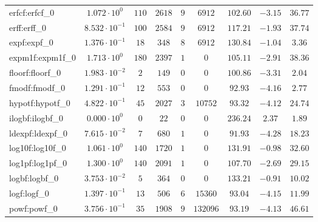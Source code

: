 \begin{tabular}{|l|c|c|c|c|c|c|c|c|}
erfcf:erfcf\_0               & $ 1.072 \cdot 10^{0}  $ & $ 110    $ & $ 2618  $ & $ 9   $ & $ 6912   $ & $ 102.60      $ & $ -3.15   $ & $ 36.77   $ \\
erff:erff\_0                 & $ 8.532 \cdot 10^{-1} $ & $ 100    $ & $ 2584  $ & $ 9   $ & $ 6912   $ & $ 117.21      $ & $ -1.93   $ & $ 37.74   $ \\
expf:expf\_0                 & $ 1.376 \cdot 10^{-1} $ & $ 18     $ & $ 348   $ & $ 8   $ & $ 6912   $ & $ 130.84      $ & $ -1.04   $ & $ 3.36    $ \\
expm1f:expm1f\_0             & $ 1.713 \cdot 10^{0}  $ & $ 180    $ & $ 2397  $ & $ 1   $ & $ 0      $ & $ 105.11      $ & $ -2.91   $ & $ 38.36   $ \\
floorf:floorf\_0             & $ 1.983 \cdot 10^{-2} $ & $ 2      $ & $ 149   $ & $ 0   $ & $ 0      $ & $ 100.86      $ & $ -3.31   $ & $ 2.04    $ \\
fmodf:fmodf\_0               & $ 1.291 \cdot 10^{-1} $ & $ 12     $ & $ 553   $ & $ 0   $ & $ 0      $ & $ 92.93       $ & $ -4.16   $ & $ 2.77    $ \\
hypotf:hypotf\_0             & $ 4.822 \cdot 10^{-1} $ & $ 45     $ & $ 2027  $ & $ 3   $ & $ 10752  $ & $ 93.32       $ & $ -4.12   $ & $ 24.74   $ \\
ilogbf:ilogbf\_0             & $ 0.000 \cdot 10^{0}  $ & $ 0      $ & $ 22    $ & $ 0   $ & $ 0      $ & $ 236.24      $ & $ 2.37    $ & $ 1.89    $ \\
ldexpf:ldexpf\_0             & $ 7.615 \cdot 10^{-2} $ & $ 7      $ & $ 680   $ & $ 1   $ & $ 0      $ & $ 91.93       $ & $ -4.28   $ & $ 18.23   $ \\
log10f:log10f\_0             & $ 1.061 \cdot 10^{0}  $ & $ 140    $ & $ 1720  $ & $ 1   $ & $ 0      $ & $ 131.91      $ & $ -0.98   $ & $ 32.60   $ \\
log1pf:log1pf\_0             & $ 1.300 \cdot 10^{0}  $ & $ 140    $ & $ 2091  $ & $ 1   $ & $ 0      $ & $ 107.70      $ & $ -2.69   $ & $ 29.15   $ \\
logbf:logbf\_0               & $ 3.753 \cdot 10^{-2} $ & $ 5      $ & $ 364   $ & $ 0   $ & $ 0      $ & $ 133.21      $ & $ -0.91   $ & $ 10.02   $ \\
logf:logf\_0                 & $ 1.397 \cdot 10^{-1} $ & $ 13     $ & $ 506   $ & $ 6   $ & $ 15360  $ & $ 93.04       $ & $ -4.15   $ & $ 11.99   $ \\
powf:powf\_0                 & $ 3.756 \cdot 10^{-1} $ & $ 35     $ & $ 1908  $ & $ 9   $ & $ 132096 $ & $ 93.19       $ & $ -4.13   $ & $ 46.61   $ \\

\end{tabular}
